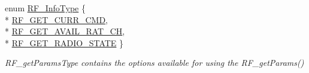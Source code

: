 \begin{DoxyCompactItemize}
enum \hyperlink{_r_f_8h_a22596109459422a7a4d4f386dffbb8fa}{R\+F\+\_\+\+Info\+Type} \{ \\*
\hyperlink{_r_f_8h_a22596109459422a7a4d4f386dffbb8faa4a4b88384acfaa135421ad57557140e6}{R\+F\+\_\+\+G\+E\+T\+\_\+\+C\+U\+R\+R\+\_\+\+C\+M\+D}, 
\\*
\hyperlink{_r_f_8h_a22596109459422a7a4d4f386dffbb8faa19ebdcf12bef1328ce40fec49c0f6864}{R\+F\+\_\+\+G\+E\+T\+\_\+\+A\+V\+A\+I\+L\+\_\+\+R\+A\+T\+\_\+\+C\+H}, 
\\*
\hyperlink{_r_f_8h_a22596109459422a7a4d4f386dffbb8faa51ac83691ed47bb591818e2e34e49d44}{R\+F\+\_\+\+G\+E\+T\+\_\+\+R\+A\+D\+I\+O\+\_\+\+S\+T\+A\+T\+E}
 \}
\begin{DoxyCompactList}\small\item\em R\+F\+\_\+get\+Params\+Type contains the options available for using the R\+F\+\_\+get\+Params() \end{DoxyCompactList}\end{DoxyCompactItemize}
